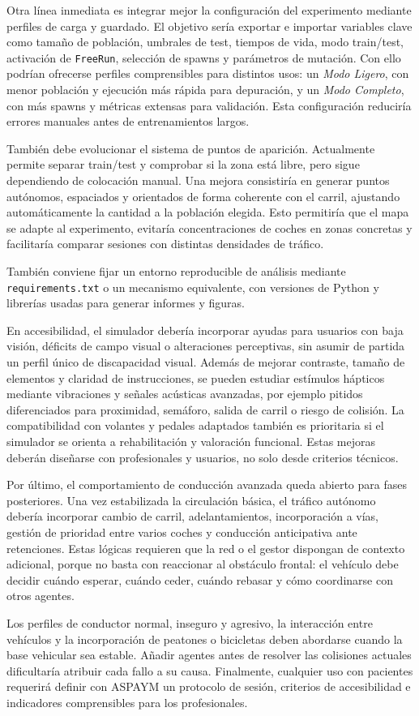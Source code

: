 Otra línea inmediata es integrar mejor la configuración del experimento mediante perfiles de carga y guardado. El objetivo sería exportar e importar variables clave como tamaño de población, umbrales de test, tiempos de vida, modo train/test, activación de \texttt{FreeRun}, selección de spawns y parámetros de mutación. Con ello podrían ofrecerse perfiles comprensibles para distintos usos: un \textit{Modo Ligero}, con menor población y ejecución más rápida para depuración, y un \textit{Modo Completo}, con más spawns y métricas extensas para validación. Esta configuración reduciría errores manuales antes de entrenamientos largos.

También debe evolucionar el sistema de puntos de aparición. Actualmente permite separar train/test y comprobar si la zona está libre, pero sigue dependiendo de colocación manual. Una mejora consistiría en generar puntos autónomos, espaciados y orientados de forma coherente con el carril, ajustando automáticamente la cantidad a la población elegida. Esto permitiría que el mapa se adapte al experimento, evitaría concentraciones de coches en zonas concretas y facilitaría comparar sesiones con distintas densidades de tráfico.

También conviene fijar un entorno reproducible de análisis mediante \texttt{requirements.txt} o un mecanismo equivalente, con versiones de Python y librerías usadas para generar informes y figuras.

En accesibilidad, el simulador debería incorporar ayudas para usuarios con baja visión, déficits de campo visual o alteraciones perceptivas, sin asumir de partida un perfil único de discapacidad visual. Además de mejorar contraste, tamaño de elementos y claridad de instrucciones, se pueden estudiar estímulos hápticos mediante vibraciones y señales acústicas avanzadas, por ejemplo pitidos diferenciados para proximidad, semáforo, salida de carril o riesgo de colisión. La compatibilidad con volantes y pedales adaptados también es prioritaria si el simulador se orienta a rehabilitación y valoración funcional. Estas mejoras deberán diseñarse con profesionales y usuarios, no solo desde criterios técnicos.

Por último, el comportamiento de conducción avanzada queda abierto para fases posteriores. Una vez estabilizada la circulación básica, el tráfico autónomo debería incorporar cambio de carril, adelantamientos, incorporación a vías, gestión de prioridad entre varios coches y conducción anticipativa ante retenciones. Estas lógicas requieren que la red o el gestor dispongan de contexto adicional, porque no basta con reaccionar al obstáculo frontal: el vehículo debe decidir cuándo esperar, cuándo ceder, cuándo rebasar y cómo coordinarse con otros agentes.

Los perfiles de conductor normal, inseguro y agresivo, la interacción entre vehículos y la incorporación de peatones o bicicletas deben abordarse cuando la base vehicular sea estable. Añadir agentes antes de resolver las colisiones actuales dificultaría atribuir cada fallo a su causa. Finalmente, cualquier uso con pacientes requerirá definir con ASPAYM un protocolo de sesión, criterios de accesibilidad e indicadores comprensibles para los profesionales.
